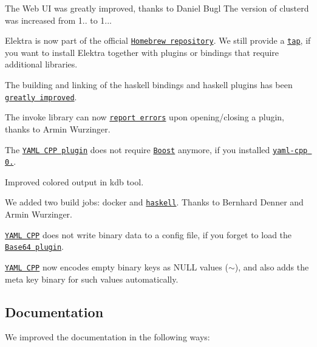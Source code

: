 \begin{DoxyItemize}
\item The Web UI was greatly improved, thanks to Daniel Bugl The version of clusterd was increased from 1.. to 1...
\item Elektra is now part of the official \href{http://formulae.brew.sh/formula/elektra}{\tt Homebrew repository}. We still provide a \href{http://github.com/ElektraInitiative/homebrew-elektra}{\tt tap}, if you want to install Elektra together with plugins or bindings that require additional libraries.
\item The building and linking of the haskell bindings and haskell plugins has been \href{https://github.com/ElektraInitiative/libelektra/pull/1698}{\tt greatly improved}.
\item The invoke library can now \href{https://github.com/ElektraInitiative/libelektra/pull/1801}{\tt report errors} upon opening/closing a plugin, thanks to Armin Wurzinger.
\item The \href{https://www.libelektra.org/plugins/yamlcpp}{\tt Y\+A\+ML C\+PP plugin} does not require \href{http://www.boost.org}{\tt Boost} anymore, if you installed \href{https://github.com/jbeder/yaml-cpp/releases/tag/yaml-cpp-0.6.0}{\tt yaml-\/cpp 0.}.
\item Improved colored output in {\ttfamily kdb} tool.
\item We added two build jobs\+: docker and \href{https://build.libelektra.org/job/elektra-haskell/}{\tt haskell}. Thanks to Bernhard Denner and Armin Wurzinger.
\item \href{https://www.libelektra.org/plugins/yamlcpp}{\tt Y\+A\+ML C\+PP} does not write binary data to a config file, if you forget to load the \href{https://www.libelektra.org/plugins/base64}{\tt Base64 plugin}.
\item \href{https://www.libelektra.org/plugins/yamlcpp}{\tt Y\+A\+ML C\+PP} now encodes empty binary keys as N\+U\+LL values ({\ttfamily $\sim$}), and also adds the meta key {\ttfamily binary} for such values automatically.
\end{DoxyItemize}

\subsection*{Documentation}

We improved the documentation in the following ways\+:


